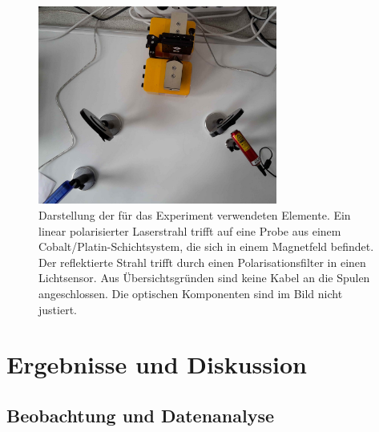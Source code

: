 \documentclass[
	a4paper,
	12pt,
	pagesize,
	ngerman
]{scrartcl}
\begin{document}
	\begin{figure}[H] 
		\includegraphics[width=0.7\textwidth]{O4_Aufbau} %
		\centering
		\caption{Darstellung der für das Experiment verwendeten Elemente. Ein linear polarisierter Laserstrahl trifft auf eine Probe aus einem Cobalt/Platin-Schichtsystem, die sich in einem Magnetfeld befindet. Der reflektierte Strahl trifft durch einen Polarisationsfilter in einen Lichtsensor. Aus Übersichtsgründen sind keine Kabel an die Spulen angeschlossen. Die optischen Komponenten sind im Bild nicht justiert.} 
		\label{fig_aufbau}
		\centering
	\end{figure}
	
	\section{Ergebnisse und Diskussion}
	

	\subsection{Beobachtung und Datenanalyse}
\end{document}
